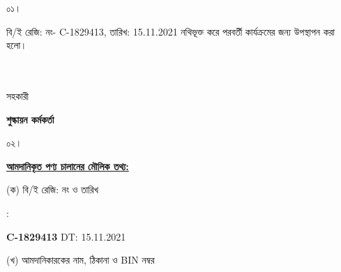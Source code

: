 \documentclass[12pt]{article}
\newcommand{\beno}{C-1829413}
\newcommand{\bedt}{15.11.2021}
\begin{document}
\noindent
\begin{minipage}[t]{0.05\linewidth}
০১।
\end{minipage}
\begin{minipage}[t]{0.95\linewidth}
বি/ই রেজি: নং- {\beno}, তারিখ: {\bedt}
নথিভূক্ত করে
পরবর্তী কার্যক্রমের জন্য উপস্থাপন করা হলো।
\\
\\
\\
\end{minipage}
\begin{minipage}[t]{0.05\linewidth}
\hspace*{1em}
\end{minipage}
\begin{minipage}[t]{0.05\linewidth}
সহকারী
\end{minipage}
\begin{minipage}[t]{0.40\linewidth}
\hspace{1em}
\end{minipage}
\begin{minipage}[t]{0.50\linewidth}
\textbf{শুল্কায়ন কর্মকর্তা}
\\
\end{minipage}
\begin{minipage}[t]{0.05\linewidth}
০২।
\end{minipage}
\begin{minipage}[t]{0.95\linewidth}
\underline{\textbf {আমদানিকৃত পণ্য চালানের
মৌলিক তথ্য:}}
\\
\end{minipage}
\footnotesize
\begin{minipage}[t]{0.05\linewidth}
\hspace*{1em}
\end{minipage}
\begin{minipage}[t]{0.45\linewidth}
(ক) বি/ই রেজি: নং ও তারিখ
\end{minipage}
\begin{minipage}[t]{0.02\linewidth}
:
\end{minipage}
\begin{minipage}[t]{0.50\linewidth}
\textbf{{\beno}} \hspace{2em} DT: {\bedt}
\\
\end{minipage}
\begin{minipage}[t]{0.05\linewidth}
\hspace*{1em}
\end{minipage}
\begin{minipage}[t]{0.45\linewidth}
(খ) আমদানিকারকের নাম, ঠিকানা
ও BIN নম্বর
\end{minipage}
\end{document}
